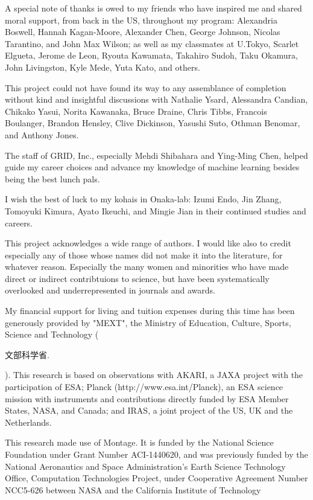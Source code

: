      A special note of thanks is owed to my friends who have inspired me and shared moral support, from back in the US, throughout my program: Alexandria Boswell, Hannah Kagan-Moore, Alexander Chen, George Johnson, Nicolas Tarantino, and John Max Wilson; as well as my classmates at U.Tokyo, Scarlet Elgueta, Jerome de Leon, Ryouta Kawamata, Takahiro Sudoh, Taku Okamura, John Livingston, Kyle Mede, Yuta Kato, and others.

     This project could not have found its way to any assemblance of completion without kind and insightful discussions with Nathalie Ysard, Alessandra Candian,  Chikako Yasui, Norita Kawanaka, Bruce Draine, Chris Tibbs, Francois Boulanger, Brandon Hensley, Clive Dickinson, Yasushi Suto, Othman Benomar, and Anthony Jones.

     The staff of GRID, Inc., especially Mehdi Shibahara and Ying-Ming Chen, helped guide my career choices and advance my knowledge of machine learning besides being the best lunch pals.

     I wish the best of luck to my kohais in Onaka-lab: Izumi Endo, Jin Zhang, Tomoyuki Kimura, Ayato Ikeuchi, and Mingie Jian in their continued studies and careers.

     This project acknowledges a wide range of authors. I would like also to credit especially any of those whose names did not make it into the literature, for whatever reason. Especially the many women and minorities who have made direct or indirect contribtuions to science, but have been systematically overlooked and underrepresented in journals and awards.

     My financial support for living and tuition expenses during this time has been generously provided by "MEXT", the Ministry of Education, Culture, Sports, Science and Technology (\begin{CJK}{UTF8}{min}文部科学省.\end{CJK}). This research is based on observations with AKARI, a JAXA project with the participation of ESA; Planck (http://www.esa.int/Planck), an ESA science mission with instruments and contributions directly funded by ESA Member States, NASA, and Canada; and IRAS, a joint project of the US, UK and the Netherlands.

    This research made use of Montage. It is funded by the National Science Foundation under Grant Number ACI-1440620, and was previously funded by the National Aeronautics and Space Administration's Earth Science Technology Office, Computation Technologies Project, under Cooperative Agreement Number NCC5-626 between NASA and the California Institute of Technology
